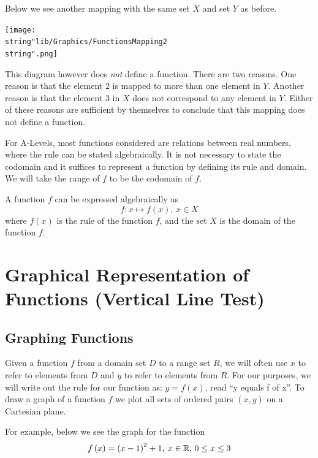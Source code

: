 \documentclass[11pt,a4paper]{book}
\newcommand{\R}{\mathbb{R}}
\begin{document}
Below we see another mapping with the same set $X$ and set $Y$ as
before.
\begin{center}
\texttt{[image: \\string"lib/Graphics/FunctionsMapping2\\string".png]}
\par\end{center}

This diagram however does \textit{not} define a function. There are
two reasons. One reason is that the element $2$ is mapped to more than one element in $Y$. Another reason is that the element $3$ in $X$ does not correspond to any element in $Y$. Either of these reasons are sufficient by themselves to conclude that this mapping does not define a function.

\medskip{}

For A-Levels, most functions considered are relations between real numbers, where the rule can be stated algebraically. It is not necessary to state the codomain and it suffices to represent a function by defining its rule and domain. We will take the range of $f$ to be the codomain of $f$.

A function $f$ can be expressed algebraically as
\[
f:x\mapsto f\left(x\right),\,x\in X
\]
where $f\left(x\right)$ is the rule of the function $f$, and the
set $X$ is the domain of the function $f$.

\newpage

\section{Graphical Representation of Functions (Vertical Line Test)}

\subsection{Graphing Functions}

Given a function $f$ from a domain set $D$ to a range set $R$, we will often use $x$ to refer to elements from $D$ and $y$ to refer to elements from $R$. For our purposes, we will write out the rule for our function as: $y=f(x)$, read \textquotedblleft y equals f of x\textquotedblright . To draw a graph of a function $f$ we plot all sets of ordered pairs $\left(x,y\right)$ on a Cartesian plane.

For example, below we see the graph for the function
\[
f\left(x\right)=\left(x-1\right)^{2}+1,\:x\in\R\text{, \ensuremath{0\leq x\leq3}}
\]
\end{document}
